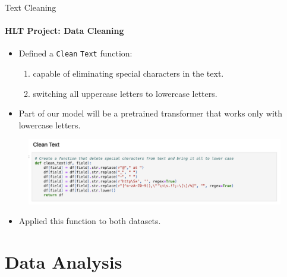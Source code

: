 \documentclass{beamer}
\theoremstyle{definition}
\theoremstyle{plain}
\begin{document}
\begin{frame}{Text Cleaning}
\framesubtitle{HLT Project: Data Cleaning}
{\small 

\begin{itemize}
    \item Defined a \texttt{Clean} \texttt{Text} function:
    \begin{enumerate}
        \item capable of eliminating special characters in the text.
        \item switching all uppercase letters to lowercase letters.
    \end{enumerate}
    \item Part of our model will be a pretrained transformer that works only with lowercase letters.
\end{itemize}

\begin{figure}
    \centering
    \includegraphics[scale=0.4, trim=0 0 0 1cm]{Figures/clean_text.png}
\end{figure}

\vspace{-0.5cm}
\begin{itemize}
    \item Applied this function to both datasets.
\end{itemize}
}
\end{frame}

\section{Data Analysis}
\end{document}
